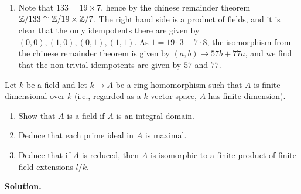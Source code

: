 \documentclass[a4paper,11pt]{article}
\begin{document}
\begin{enumerate}
    \item Note that $133 = 19 \times 7$, hence by the chinese remainder theorem
        $\mathbb{Z}/133 \cong \mathbb{Z}/19 \times \mathbb{Z}/7$. The right hand side is a product of 
        fields, and it is clear that the only idempotents there are given by 
        $(0,0), (1,0), (0,1), (1,1)$. As $1= 19 \cdot 3 - 7 \cdot 8$, 
        the isomorphism from the chinese remainder theorem is given by 
        $(a,b) \mapsto 57b + 77a$, and we find that the non-trivial idempotents
        are given by $57$ and $77$. 
\end{enumerate}


Let $k$ be a field and let $k \to A$ be a ring homomorphism such that 
$A$ is finite dimensional over $k$ (i.e., regarded as a $k$-vector space,
$A$ has finite dimension).
\begin{enumerate}
    \item Show that $A$ is a field if $A$ is an integral domain.
    \item Deduce that each prime ideal in $A$ is maximal.
    \item Deduce that if $A$ is reduced, then $A$ is isomorphic to a finite 
        product of finite field extensions $l/k$. 
\end{enumerate}
\textbf{Solution.}
\end{document}
